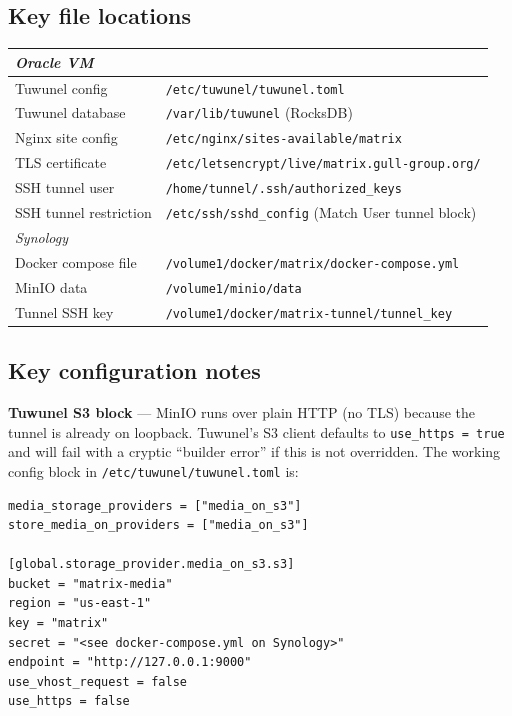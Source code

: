 \documentclass[11pt]{article}
\begin{document}
\subsection*{Key file locations}

\begin{center}
\begin{tabular}{ll}
\hline
\multicolumn{2}{l}{\textit{Oracle VM}} \\
\hline
Tuwunel config        & \texttt{/etc/tuwunel/tuwunel.toml} \\
Tuwunel database      & \texttt{/var/lib/tuwunel} (RocksDB) \\
Nginx site config     & \texttt{/etc/nginx/sites-available/matrix} \\
TLS certificate       & \texttt{/etc/letsencrypt/live/matrix.gull-group.org/} \\
SSH tunnel user       & \texttt{/home/tunnel/.ssh/authorized\_keys} \\
SSH tunnel restriction& \texttt{/etc/ssh/sshd\_config} (Match User tunnel block) \\
\hline
\multicolumn{2}{l}{\textit{Synology}} \\
\hline
Docker compose file   & \texttt{/volume1/docker/matrix/docker-compose.yml} \\
MinIO data            & \texttt{/volume1/minio/data} \\
Tunnel SSH key        & \texttt{/volume1/docker/matrix-tunnel/tunnel\_key} \\
\hline
\end{tabular}
\end{center}

\subsection*{Key configuration notes}

\textbf{Tuwunel S3 block} --- MinIO runs over plain HTTP (no TLS) because the
tunnel is already on loopback.  Tuwunel's S3 client defaults to
\texttt{use\_https = true} and will fail with a cryptic ``builder error'' if
this is not overridden.  The working config block in
\texttt{/etc/tuwunel/tuwunel.toml} is:

\begin{verbatim}
media_storage_providers = ["media_on_s3"]
store_media_on_providers = ["media_on_s3"]

[global.storage_provider.media_on_s3.s3]
bucket = "matrix-media"
region = "us-east-1"
key = "matrix"
secret = "<see docker-compose.yml on Synology>"
endpoint = "http://127.0.0.1:9000"
use_vhost_request = false
use_https = false
\end{verbatim}
\end{document}
